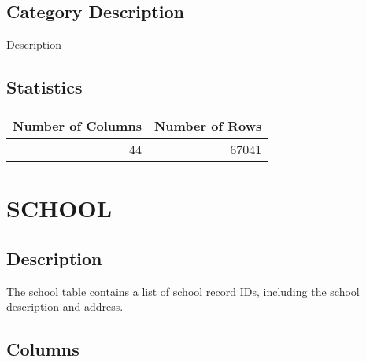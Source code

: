\documentclass[
  letterpaper,
  DIV=11,
  numbers=noendperiod]{scrreprt}
\begin{document}
\hypertarget{category-description-33}{%
\section*{Category Description}\label{category-description-33}}

Description

\hypertarget{statistics-33}{%
\section*{Statistics}\label{statistics-33}}

\begin{longtable}{rr}
\toprule
Number of Columns & Number of Rows \\ 
\midrule
44 & 67041 \\ 
\bottomrule
\end{longtable}

\hypertarget{school}{%
\chapter*{SCHOOL}\label{school}}

\hypertarget{description-34}{%
\section*{Description}\label{description-34}}

The school table contains a list of school record IDs, including the
school description and address.

\hypertarget{columns-34}{%
\section*{Columns}\label{columns-34}}
\end{document}
